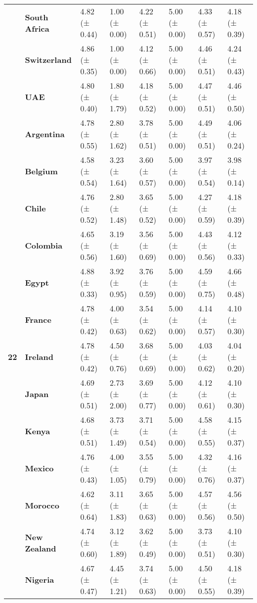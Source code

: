 \begin{longtable}{llllllll}
\textbf{} & \textbf{South Africa} & 4.82 (± 0.44) & 1.00 (± 0.00) & 4.22 (± 0.51) & 5.00 (± 0.00) & 4.33 (± 0.57) & 4.18 (± 0.39) \\
\textbf{} & \textbf{Switzerland} & 4.86 (± 0.35) & 1.00 (± 0.00) & 4.12 (± 0.66) & 5.00 (± 0.00) & 4.46 (± 0.51) & 4.24 (± 0.43) \\
\textbf{} & \textbf{UAE} & 4.80 (± 0.40) & 1.80 (± 1.79) & 4.18 (± 0.52) & 5.00 (± 0.00) & 4.47 (± 0.51) & 4.46 (± 0.50) \\
\cline{1-8}
\multirow[t]{19}{*}{\textbf{22}} & \textbf{Argentina} & 4.78 (± 0.55) & 2.80 (± 1.62) & 3.78 (± 0.51) & 5.00 (± 0.00) & 4.49 (± 0.51) & 4.06 (± 0.24) \\
\textbf{} & \textbf{Belgium} & 4.58 (± 0.54) & 3.23 (± 1.64) & 3.60 (± 0.57) & 5.00 (± 0.00) & 3.97 (± 0.54) & 3.98 (± 0.14) \\
\textbf{} & \textbf{Chile} & 4.76 (± 0.52) & 2.80 (± 1.48) & 3.65 (± 0.52) & 5.00 (± 0.00) & 4.27 (± 0.59) & 4.18 (± 0.39) \\
\textbf{} & \textbf{Colombia} & 4.65 (± 0.56) & 3.19 (± 1.60) & 3.56 (± 0.69) & 5.00 (± 0.00) & 4.43 (± 0.56) & 4.12 (± 0.33) \\
\textbf{} & \textbf{Egypt} & 4.88 (± 0.33) & 3.92 (± 0.95) & 3.76 (± 0.59) & 5.00 (± 0.00) & 4.59 (± 0.75) & 4.66 (± 0.48) \\
\textbf{} & \textbf{France} & 4.78 (± 0.42) & 4.00 (± 0.63) & 3.54 (± 0.62) & 5.00 (± 0.00) & 4.14 (± 0.57) & 4.10 (± 0.30) \\
\textbf{} & \textbf{Ireland} & 4.78 (± 0.42) & 4.50 (± 0.76) & 3.68 (± 0.69) & 5.00 (± 0.00) & 4.03 (± 0.62) & 4.04 (± 0.20) \\
\textbf{} & \textbf{Japan} & 4.69 (± 0.51) & 2.73 (± 2.00) & 3.69 (± 0.77) & 5.00 (± 0.00) & 4.12 (± 0.61) & 4.10 (± 0.30) \\
\textbf{} & \textbf{Kenya} & 4.68 (± 0.51) & 3.73 (± 1.49) & 3.71 (± 0.54) & 5.00 (± 0.00) & 4.58 (± 0.55) & 4.15 (± 0.37) \\
\textbf{} & \textbf{Mexico} & 4.76 (± 0.43) & 4.00 (± 1.05) & 3.55 (± 0.79) & 5.00 (± 0.00) & 4.32 (± 0.76) & 4.16 (± 0.37) \\
\textbf{} & \textbf{Morocco} & 4.62 (± 0.64) & 3.11 (± 1.83) & 3.65 (± 0.63) & 5.00 (± 0.00) & 4.57 (± 0.56) & 4.56 (± 0.50) \\
\textbf{} & \textbf{New Zealand} & 4.74 (± 0.60) & 3.12 (± 1.89) & 3.62 (± 0.49) & 5.00 (± 0.00) & 3.73 (± 0.51) & 4.10 (± 0.30) \\
\textbf{} & \textbf{Nigeria} & 4.67 (± 0.47) & 4.45 (± 1.21) & 3.74 (± 0.63) & 5.00 (± 0.00) & 4.50 (± 0.55) & 4.18 (± 0.39) \\

\end{longtable}
